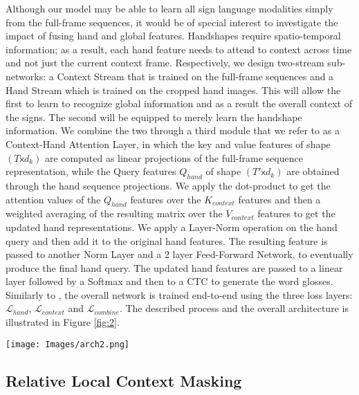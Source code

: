 \documentclass[a4paper,conference]{IEEEtran}
\begin{document}
Although our model may be able to learn all sign language modalities simply from the full-frame sequences, it would be of special interest to investigate the impact of fusing hand and global features. Handshapes require spatio-temporal information; as a result, each hand feature needs to attend to context across time and not just the current context frame.
Respectively, we design two-stream sub-networks: a Context Stream that is trained on the full-frame sequences and a Hand Stream which is trained on the cropped hand images. This will allow the first to learn to recognize global information and as a result the overall context of the signs. The second will be equipped to merely learn the handshape information. We combine the two through a third module that we refer to as a Context-Hand Attention Layer, in which the key and value features of shape $(T \mathsf{x} d_k)$ are computed as linear projections of the full-frame sequence representation, while the Query features $Q_{hand}$ of shape $(T'\mathsf{x} d_k)$ are obtained through the hand sequence projections. We apply the dot-product to get the attention values of the $Q_{hand}$ features over the $K_{context}$ features and then a weighted averaging of the resulting matrix over the $V_{context}$ features to get the updated hand representations. We apply a Layer-Norm operation on the hand query and then add it to the original hand features. The resulting feature is passed to another Norm Layer and a 2 layer Feed-Forward Network, to eventually produce the final hand query. The updated hand features are passed to a linear layer followed by a Softmax and then to a CTC to generate the word glosses. Similarly to \cite{camgoz2017subunets}, the overall network is trained end-to-end using the three loss layers: $\mathcal{L}_{hand}$, $\mathcal{L}_{context}$ and $\mathcal{L}_{combine}$. The described process and the overall architecture is illustrated in Figure \ref{fig:2}.

\begin{figure*}[t]
 \centering
 \texttt{[image: Images/arch2.png]}
 \caption{Combination of both the full-frame and the handshape streams through a Context-Hand Attention layer.}
\label{fig:2}
\end{figure*}


\subsection{Relative Local Context Masking}
	
\end{document}
